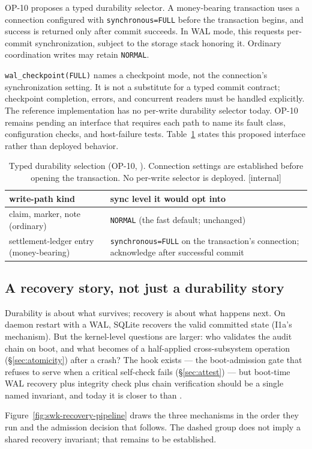\documentclass[11pt,a4paper]{article}
\theoremstyle{definition}
\theoremstyle{remark}
\begin{document}
OP-10 proposes a typed durability selector. A money-bearing transaction uses
a connection configured with \texttt{synchronous=FULL} before the transaction
begins, and success is returned only after commit succeeds. In WAL mode, this
requests per-commit synchronization, subject to the storage stack honoring it.
Ordinary coordination writes may retain \texttt{NORMAL}.

\texttt{wal\_checkpoint(FULL)} names a checkpoint mode, not the connection's
synchronization setting. It is not a substitute for a typed commit contract;
checkpoint completion, errors, and concurrent readers must be handled explicitly.
The reference implementation has no per-write durability selector today. OP-10
remains \Open{} pending an interface that requires each path to name its fault
class, configuration checks, and host-failure tests. Table~\ref{tab:swk-selective-checkpoint}
states this proposed interface rather than deployed behavior.
\begin{table}[H]
\centering
\caption{Typed durability selection (OP-10, \Designed). Connection settings
are established before opening the transaction. No per-write selector is deployed. [internal]}
\label{tab:swk-selective-checkpoint}
\small
\renewcommand{\arraystretch}{1.2}
\begin{tabularx}{\textwidth}{@{}>{\raggedright\arraybackslash}X >{\raggedright\arraybackslash}X@{}}
\toprule
\textbf{write-path kind} & \textbf{sync level it would opt into} \\
\midrule
claim, marker, note (ordinary) & \texttt{NORMAL} (the fast default; unchanged) \\
settlement-ledger entry (money-bearing) & \texttt{synchronous=FULL} on the transaction's connection; acknowledge after successful commit \\
\bottomrule
\end{tabularx}
\end{table}
\subsection{A recovery story, not just a durability story}
Durability is about what survives; recovery is about what happens next. On daemon
restart with a WAL, SQLite recovers the valid committed state (I1a's
mechanism). But the kernel-level questions are larger: who validates the audit
chain on boot, and what becomes of a half-applied cross-subsystem operation
(\S\ref{sec:atomicity}) after a crash? The hook exists --- the boot-admission gate
that refuses to serve when a critical self-check fails (\S\ref{sec:attest}) ---
but boot-time WAL recovery plus integrity check plus chain verification should be a
single named invariant, and today it is closer to \BuiltWeak{} than \Built.

Figure~\ref{fig:swk-recovery-pipeline} draws the three mechanisms in the
order they run and the admission decision that follows. The dashed group
does not imply a shared recovery invariant; that remains to be established.
\pdexercisepointer{\ref{ex:swk-fault-classes}}{\ref{ex:swk-op10-interface}}{\pageref{ex:swk-fault-classes}}
\end{document}
